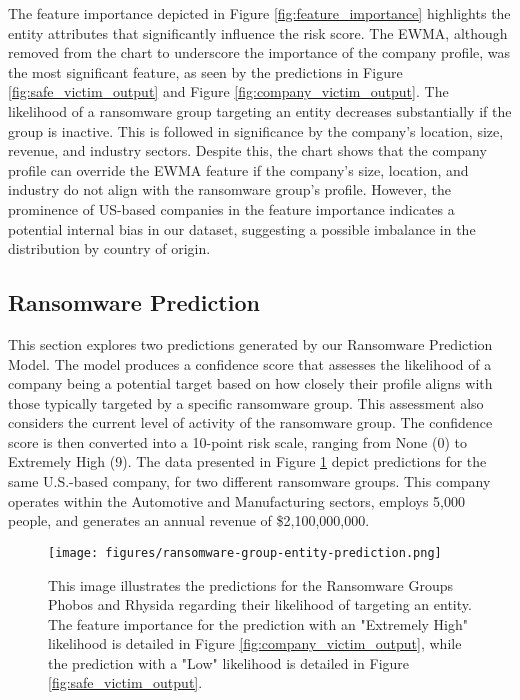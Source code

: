 \documentclass[running heads]{llncs}
\begin{document}
The feature importance depicted in Figure \ref{fig:feature_importance} highlights the entity attributes that significantly influence the risk score. The EWMA, although removed from the chart to underscore the importance of the company profile, was the most significant feature, as seen by the predictions in Figure \ref{fig:safe_victim_output} and Figure \ref{fig:company_victim_output}. The likelihood of a ransomware group targeting an entity decreases substantially if the group is inactive. This is followed in significance by the company's location, size, revenue, and industry sectors. Despite this, the chart shows that the company profile can override the EWMA feature if the company’s size, location, and industry do not align with the ransomware group's profile. However, the prominence of US-based companies in the feature importance indicates a potential internal bias in our dataset, suggesting a possible imbalance in the distribution by country of origin.

\subsection{Ransomware Prediction}\label{ransomware_predictions}
\vspace{6pt}
This section explores two predictions generated by our Ransomware Prediction Model. The model produces a confidence score that assesses the likelihood of a company being a potential target based on how closely their profile aligns with those typically targeted by a specific ransomware group. This assessment also considers the current level of activity of the ransomware group. The confidence score is then converted into a 10-point risk scale, ranging from None (0) to Extremely High (9). The data presented in Figure \ref{fig:ransomware-prediction} depict predictions for the same U.S.-based company, for two different ransomware groups. This company operates within the Automotive and Manufacturing sectors, employs 5,000 people, and generates an annual revenue of \$2,100,000,000.


\begin{figure}
  \captionsetup{
    belowskip=-8pt,
  }
  \centering
  \texttt{[image: figures/ransomware-group-entity-prediction.png]}%
\caption[Ransomware Victim Prediction]{This image illustrates the predictions for the Ransomware Groups Phobos and Rhysida regarding their likelihood of targeting an entity. The feature importance for the prediction with an "Extremely High" likelihood is detailed in Figure \ref{fig:company_victim_output}, while the prediction with a "Low" likelihood is detailed in Figure \ref{fig:safe_victim_output}.}
  \label{fig:ransomware-prediction}
\end{figure}
\end{document}

